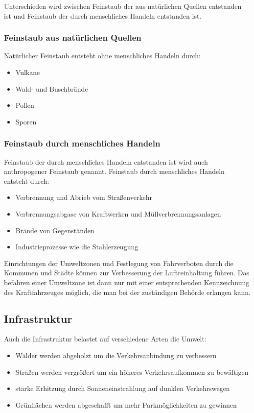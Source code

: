 Unterschieden wird zwischen Feinstaub der aus natürlichen Quellen entstanden ist und Feinstaub der durch menschliches Handeln entstanden ist.

\subsubsection{Feinstaub aus natürlichen Quellen}
Natürlicher Feinstaub entsteht ohne menschliches Handeln durch:
\begin{itemize}
	\item Vulkane
	\item Wald- und Buschbrände
	\item Pollen
	\item Sporen
\end{itemize}


\subsubsection{Feinstaub durch menschliches Handeln}
Feinstaub der durch menschliches Handeln entstanden ist wird auch anthropogener Feinstaub genannt.
Feinstaub durch menschliches Handeln entsteht durch:
\begin{itemize}
	\item Verbrennung und Abrieb vom Straßenverkehr
	\item Verbrennungsabgase von Kraftwerken und Müllverbrennungsanlagen
	\item Brände von Gegenständen
	\item Industrieprozesse wie die Stahlerzeugung
\end{itemize}

Einrichtungen der Umweltzonen und Festlegung von Fahrverboten durch die Kommunen und Städte können zur Verbesserung der Luftreinhaltung führen.
Das befahren einer Umweltzone ist dann nur mit einer entsprechenden Kennzeichnung des Kraftfahrzeuges möglich, die man bei der zuständigen Behörde erlangen kann.



\subsection{Infrastruktur}
Auch die Infrastruktur belastet auf verschiedene Arten die Umwelt:
\begin{itemize}
	\item Wälder werden abgeholzt um die Verkehrsanbindung zu verbessern
	\item Straßen werden vergrößert um ein höheres Verkehrsaufkommen zu bewältigen
	\item starke Erhitzung durch Sonneneinstrahlung auf dunklen Verkehrswegen
	\item Grünflächen werden abgeschafft um mehr Parkmöglichkeiten zu gewinnen
\end{itemize}
